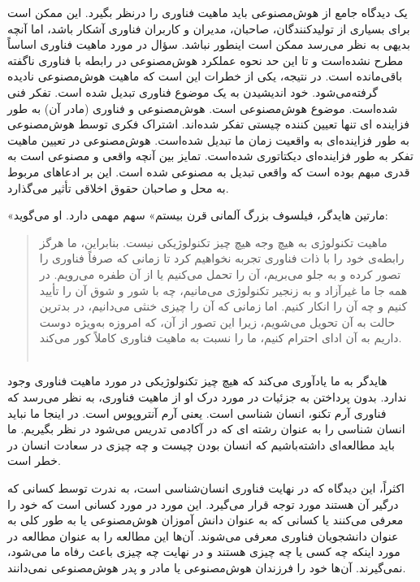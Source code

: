 یک دیدگاه جامع از هوش‌مصنوعی باید ماهیت فناوری را در‌نظر بگیرد.
این ممکن است برای بسیاری از تولیدکنندگان، صاحبان، مدیران و کاربران فناوری آشکار باشد، اما آنچه بدیهی به نظر می‌رسد ممکن است اینطور نباشد.
سؤال در مورد ماهیت فناوری اساساً مطرح نشده‌است و تا این حد نحوه عملکرد هوش‌مصنوعی در رابطه با فناوری ناگفته باقی‌مانده است.
در نتیجه، یکی از خطرات این است که ماهیت هوش‌مصنوعی نادیده گرفته‌می‌شود.
خود اندیشیدن به یک موضوع فناوری تبدیل شده است.
تفکر فنی شده‌است.
موضوع هوش‌مصنوعی است.
هوش‌مصنوعی و فناوری (مادر آن) به طور فزاینده ای تنها تعیین کننده چیستی تفکر شده‌اند.
اشتراک فکری توسط هوش‌مصنوعی به طور فزاینده‌ای به واقعیت زمان ما تبدیل شده‌است.
هوش‌مصنوعی در تعیین ماهیت تفکر به طور فزاینده‌ای دیکتاتوری شده‌است.
تمایز بین آنچه واقعی و مصنوعی است به قدری مبهم بوده است که واقعی تبدیل به مصنوعی شده است.
این بر ادعاهای مربوط به محل و صاحبان حقوق اخلاقی تأثیر می‌گذارد.

«مارتین هایدگر، فیلسوف بزرگ آلمانی قرن بیستم» سهم مهمی دارد.
او می‌گوید:

\begin{quote}
    ماهیت تکنولوژی به هیچ وجه هیچ چیز تکنولوژیکی نیست.
    بنابراین، ما هرگز رابطه‌ی خود را با ذات فناوری تجربه نخواهیم کرد تا زمانی که صرفاً فناوری را تصور کرده و به جلو می‌بریم، آن را تحمل می‌کنیم یا از آن طفره می‌رویم.
    در همه جا ما غیرآزاد و به زنجیر تکنولوژی می‌مانیم، چه با شور و شوق آن را تأیید کنیم و چه آن را انکار کنیم.
    اما زمانی که آن را چیزی خنثی می‌دانیم، در بدترین حالت به آن تحویل می‌شویم، زیرا این تصور از آن، که امروزه به‌ویژه دوست داریم به آن ادای احترام کنیم، ما را نسبت به ماهیت فناوری کاملاً کور می‌کند.
    \\\\
    \newline
    \newline
\end{quote}

هایدگر به ما یادآوری می‌کند که هیچ چیز تکنولوژیکی در مورد ماهیت فناوری وجود ندارد.
بدون پرداختن به جزئیات در مورد درک او از ماهیت فناوری، به نظر می‌رسد که فناوری آرم تکنو، انسان شناسی است.
یعنی آرم آنتروپوس است.
در اینجا ما نباید انسان شناسی را به عنوان رشته ای که در آکادمی تدریس می‌شود در نظر بگیریم.
ما باید مطالعه‌ای داشته‌باشیم که انسان بودن چیست و چه چیزی در سعادت انسان در خطر است.

اکثراً، این دیدگاه که در نهایت فناوری انسان‌شناسی است، به ندرت توسط کسانی که درگیر آن هستند مورد توجه قرار می‌گیرد.
این مورد در مورد کسانی است که خود را معرفی می‌کنند یا کسانی که به عنوان دانش آموزان هوش‌مصنوعی یا به طور کلی به عنوان دانشجویان فناوری معرفی می‌شوند.
آن‌ها این مطالعه را به عنوان مطالعه در مورد اینکه چه کسی یا چه چیزی هستند و در نهایت چه چیزی باعث رفاه ما می‌شود، نمی‌گیرند.
آن‌ها خود را فرزندان هوش‌مصنوعی یا مادر و پدر هوش‌مصنوعی نمی‌دانند.

